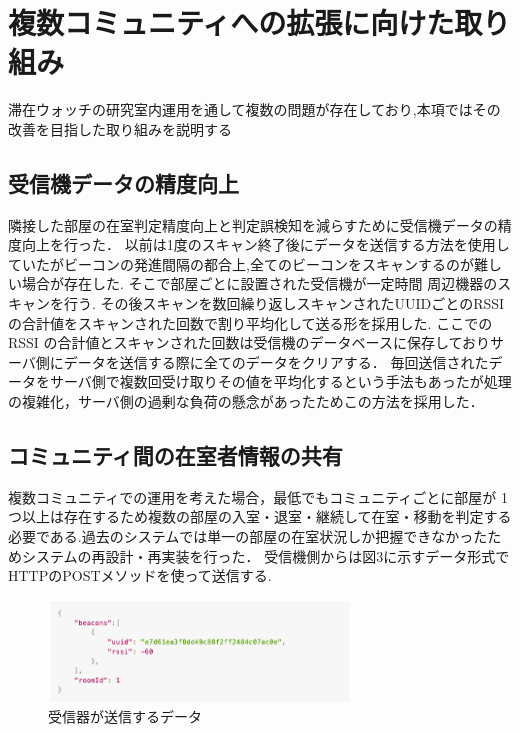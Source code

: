 \documentclass[a4j,8pt,twocolumn]{extarticle}
\begin{document}
\section{複数コミュニティへの拡張に向けた取り組み}
滞在ウォッチの研究室内運用を通して複数の問題が存在しており,本項ではその改善を目指した取り組みを説明する



\subsection{受信機データの精度向上}
隣接した部屋の在室判定精度向上と判定誤検知を減らすために受信機データの精度向上を行った．
以前は1度のスキャン終了後にデータを送信する方法を使用していたがビーコンの発進間隔の都合上,全てのビーコンをスキャンするのが難しい場合が存在した.
そこで部屋ごとに設置された受信機が一定時間 周辺機器のスキャンを行う.
その後スキャンを数回繰り返しスキャンされたUUIDごとのRSSIの合計値をスキャンされた回数で割り平均化して送る形を採用した.
ここでの RSSI の合計値とスキャンされた回数は受信機のデータベースに保存しておりサーバ側にデータを送信する際に全てのデータをクリアする．
毎回送信されたデータをサーバ側で複数回受け取りその値を平均化するという手法もあったが処理の複雑化，サーバ側の過剰な負荷の懸念があったためこの方法を採用した．



\subsection{コミュニティ間の在室者情報の共有}

複数コミュニティでの運用を考えた場合，最低でもコミュニティごとに部屋が 1 つ以上は存在するため複数の部屋の入室・退室・継続して在室・移動を判定する必要である.過去のシステムでは単一の部屋の在室状況しか把握できなかったためシステムの再設計・再実装を行った．
受信機側からは図3に示すデータ形式でHTTPのPOSTメソッドを使って送信する.
\begin{figure}[tbh]
    \centering
    \includegraphics[width=8cm]{data.jpg}
    \caption{受信器が送信するデータ}
    \label{multipleBPM}
\end{figure}
\end{document}
